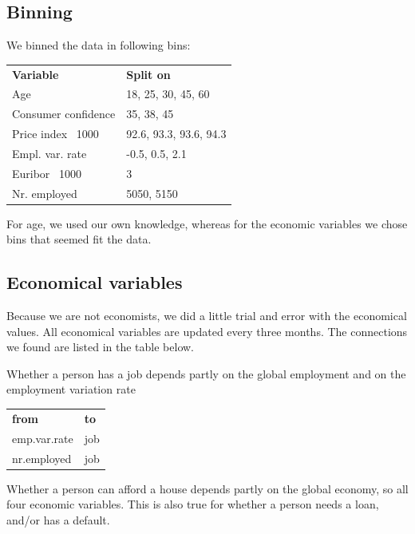 \documentclass[11pt]{article}
\begin{document}
\begin{multicols}{2}
\subsection{Binning}
We binned the data in following bins:

\medskip
\begin{tabular}{ll}
    \textbf{Variable}           & \textbf{Split on} \\
    Age                         & 18, 25, 30, 45, 60 \\
    Consumer confidence         & 35, 38, 45 \\
    Price index \ 1000          & 92.6, 93.3, 93.6, 94.3 \\
    Empl. var. rate             & -0.5, 0.5, 2.1 \\
    Euribor \ 1000              & 3 \\
    Nr. employed                & 5050, 5150 \\
\end{tabular}

For age, we used our own knowledge, whereas for the economic variables we chose bins that seemed fit the data.

\subsection{Economical variables}
Because we are not economists, we did a little trial and error with the
economical values. All economical variables are updated every three months. The
connections we found are listed in the table below. 

\bigskip
Whether a person has a job depends partly on the global employment and on the
employment variation rate

\medskip
\begin{tabular}{ll}
    \textbf{from} & \textbf{to} \\
    emp.var.rate & job\\
    nr.employed & job 
\end{tabular}

\bigskip
Whether a person can afford a house depends partly on the global economy, so all
four economic variables. This is also true for whether a person needs a loan,
and/or has a default. 


\end{multicols}
\end{document}
